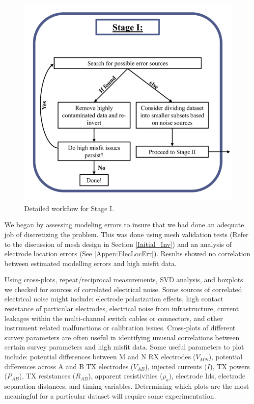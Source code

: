 \documentclass[final,authoryear,5p,times,twocolumn]{elsarticle}
\begin{document}
\begin{figure} [!ht]
\begin{center}
   \includegraphics[trim=0cm 0cm 0cm 0cm, clip=true,width=0.75\linewidth]{./Figures/Fig5.png}
\end{center}
\caption{Detailed workflow for Stage I.}
\label{fig:DataQC_workflow_StageI}
\end{figure}

We began by assessing modeling errors to insure that we had done an adequate job of discretizing the problem. This was done using mesh validation tests (Refer to the discussion of mesh design in Section \ref{Initial_Inv}) and an analysis of electrode location errors (See \ref{Appen:ElecLocErr}). Results showed no correlation between estimated modelling errors and high misfit data.

Using cross-plots, repeat/reciprocal measurements, SVD analysis, and boxplots we checked for sources of correlated electrical noise. Some sources of correlated electrical noise might include: electrode polarization effects, high contact resistance of particular electrodes, electrical noise from infrastructure, current leakages within the multi-channel switch cables or connectors, and other instrument related malfunctions or calibration issues. Cross-plots of different survey parameters are often useful in identifying unusual correlations between certain survey parameters and high misfit data. Some useful parameters to plot include: potential differences between M and N RX electrodes ($V_{MN}$), potential differences across A and B TX electrodes ($V_{AB}$), injected currents ($I$), TX powers ($P_{AB}$), TX resistances ($R_{AB}$), apparent resistivities ($\rho_a$), electrode Ids, electrode separation distances, and timing variables. Determining which plots are the most meaningful for a particular dataset will require some experimentation.
\end{document}
